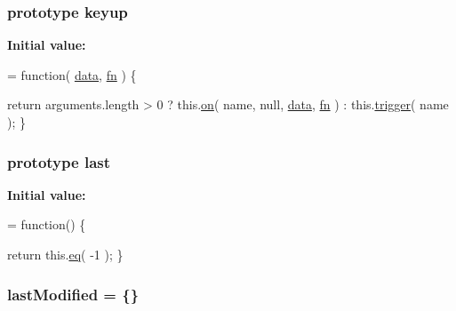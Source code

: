 \subsubsection[{keyup}]{ {\bf prototype} keyup}\label{jquery-1_810_82-vsdoc_8js_a807aea8640f7889d0e97428a1ee2c637}
{\bfseries Initial value\+:}
\begin{DoxyCode}
= \textcolor{keyword}{function}( \hyperlink{jquery-1_810_82-vsdoc_8js_a609407b3456fdc3c5671a9fc4a226ff7}{data}, \hyperlink{jquery-1_810_82-vsdoc_8js_acef6bdaf6b9b20fdcca1ea86f0902c3b}{fn} ) \{


        \textcolor{keywordflow}{return} arguments.length > 0 ?
            this.\hyperlink{jquery-1_810_82-vsdoc_8js_ae453b412b883f60220d73468ef6c6dbc}{on}( name, null, \hyperlink{jquery-1_810_82-vsdoc_8js_a609407b3456fdc3c5671a9fc4a226ff7}{data}, \hyperlink{jquery-1_810_82-vsdoc_8js_acef6bdaf6b9b20fdcca1ea86f0902c3b}{fn} ) :
            this.\hyperlink{jquery-1_810_82-vsdoc_8js_a2388c4114d5e3e4eab020f973641519c}{trigger}( name );
    \}
\end{DoxyCode}
\hypertarget{jquery-1_810_82-vsdoc_8js_a5a9684d230de11a6ec3029bcce128977}{}
\subsubsection[{last}]{ {\bf prototype} last}\label{jquery-1_810_82-vsdoc_8js_a5a9684d230de11a6ec3029bcce128977}
{\bfseries Initial value\+:}
\begin{DoxyCode}
= \textcolor{keyword}{function}() \{


        \textcolor{keywordflow}{return} this.\hyperlink{jquery-1_810_82-vsdoc_8js_a57adf3cfa88f689534e187b77491d52d}{eq}( -1 );
    \}
\end{DoxyCode}
\hypertarget{jquery-1_810_82-vsdoc_8js_ad2dea5193c0b6c575a9938fe53684bed}{}
\subsubsection[{last\+Modified}]{ last\+Modified = \{\}}\label{jquery-1_810_82-vsdoc_8js_ad2dea5193c0b6c575a9938fe53684bed}
\hypertarget{jquery-1_810_82-vsdoc_8js_aa7de35d58da66d9944ab9cbe82c19640}{}
